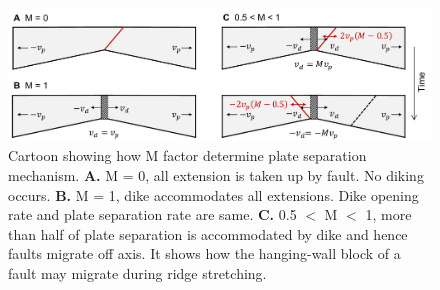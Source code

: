\documentclass[letterpaper,12pt,notitle]{memphisthesis}                     %
\begin{document}
\begin{figure}[!htb]
    \centering
    \includegraphics[width=0.99\linewidth]{./figs/mfactor.pdf}
    \caption{Cartoon showing how M factor determine plate separation mechanism. \textbf{A.} M = 0, all extension is taken up by fault. No diking occurs. \textbf{B.} M = 1, dike accommodates all extensions. Dike opening rate and plate separation rate are same. \textbf{C.} 0.5 $<$ M $<$ 1, more than half of plate separation is accommodated by dike and hence faults migrate off axis. It shows how the hanging-wall block of a fault may migrate during ridge stretching.}
    \label{fig:mcartoon}
\end{figure}
\end{document}
